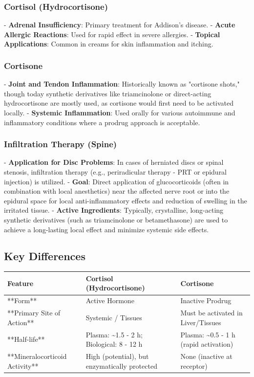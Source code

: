 \documentclass{article}
\begin{document}
\subsubsection{Cortisol (Hydrocortisone)}
- \textbf{Adrenal Insufficiency}: Primary treatment for Addison's disease.
- \textbf{Acute Allergic Reactions}: Used for rapid effect in severe allergies.
- \textbf{Topical Applications}: Common in creams for skin inflammation and itching.

\subsubsection{Cortisone}
- \textbf{Joint and Tendon Inflammation}: Historically known as "cortisone shots," though today synthetic derivatives like triamcinolone or direct-acting hydrocortisone are mostly used, as cortisone would first need to be activated locally.
- \textbf{Systemic Inflammation}: Used orally for various autoimmune and inflammatory conditions where a prodrug approach is acceptable.

\subsubsection{Infiltration Therapy (Spine)}
- \textbf{Application for Disc Problems}: In cases of herniated discs or spinal stenosis, infiltration therapy (e.g., periradicular therapy - PRT or epidural injection) is utilized.
- \textbf{Goal}: Direct application of glucocorticoids (often in combination with local anesthetics) near the affected nerve root or into the epidural space for local anti-inflammatory effects and reduction of swelling in the irritated tissue.
- \textbf{Active Ingredients}: Typically, crystalline, long-acting synthetic derivatives (such as triamcinolone or betamethasone) are used to achieve a long-lasting local effect and minimize systemic side effects.

\subsection{Key Differences}
\begin{center}
\begin{tabularx}{\textwidth}{|X|X|X|}
\hline
Feature & Cortisol (Hydrocortisone) & Cortisone \\
\hline
**Form** & Active Hormone & Inactive Prodrug \\
\hline
**Primary Site of Action** & Systemic / Tissues & Must be activated in Liver/Tissues \\
\hline
**Half-life** & Plasma: \textasciitilde{}1.5 - 2 h; Biological: 8 - 12 h & Plasma: \textasciitilde{}0.5 - 1 h (rapid activation) \\
\hline
**Mineralocorticoid Activity** & High (potential), but enzymatically protected & None (inactive at receptor) \\
\hline
\end{tabularx}
\end{center}
\end{document}
